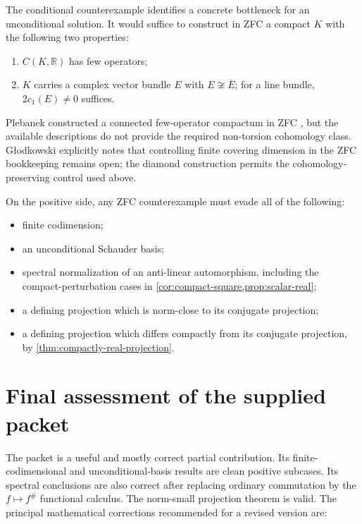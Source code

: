 \documentclass[11pt]{article}
\theoremstyle{definition}
\theoremstyle{remark}
\newcommand{\R}{\mathbb R}
\begin{document}
The conditional counterexample identifies a concrete bottleneck for an unconditional solution. It would suffice to construct in ZFC a compact $K$ with the following two properties:
\begin{enumerate}[label=(\roman*)]
\item $C(K,\R)$ has few operators;
\item $K$ carries a complex vector bundle $E$ with $E\not\cong\overline E$; for a line bundle, $2c_1(E)\ne0$ suffices.
\end{enumerate}
Plebanek constructed a connected few-operator compactum in ZFC \cite{Plebanek}, but the available descriptions do not provide the required non-torsion cohomology class. G\l odkowski explicitly notes that controlling finite covering dimension in the ZFC bookkeeping remains open; the diamond construction permits the cohomology-preserving control used above.

On the positive side, any ZFC counterexample must evade all of the following:
\begin{itemize}[leftmargin=1.7em]
\item finite codimension;
\item an unconditional Schauder basis;
\item spectral normalization of an anti-linear automorphism, including the compact-perturbation cases in \cref{cor:compact-square,prop:scalar-real};
\item a defining projection which is norm-close to its conjugate projection;
\item a defining projection which differs compactly from its conjugate projection, by \cref{thm:compactly-real-projection}.
\end{itemize}

\section{Final assessment of the supplied packet}

The packet is a useful and mostly correct partial contribution. Its finite-codimensional and unconditional-basis results are clean positive subcases. Its spectral conclusions are also correct after replacing ordinary commutation by the $f\mapsto f^{\#}$ functional calculus. The norm-small projection theorem is valid. The principal mathematical corrections recommended for a revised version are:
\end{document}
